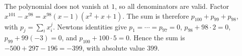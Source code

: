 The polynomial does not vanish at $1$, so all denominators are valid. Factor $x^{101}-x^{98}=x^{98}(x-1)(x^2+x+1)$. The sum is therefore $p_{100}+p_{99}+p_{98}$, with $p_j=\sum_i x_i^j$. Newton\textquotesingle s identities give $p_1=\cdots=p_{97}=0$, $p_{98}+98\cdot2=0$, $p_{99}+99(-3)=0$, and $p_{100}+100\cdot5=0$. Hence the sum is $-500+297-196=-399$, with absolute value $\boxed{399}$.
